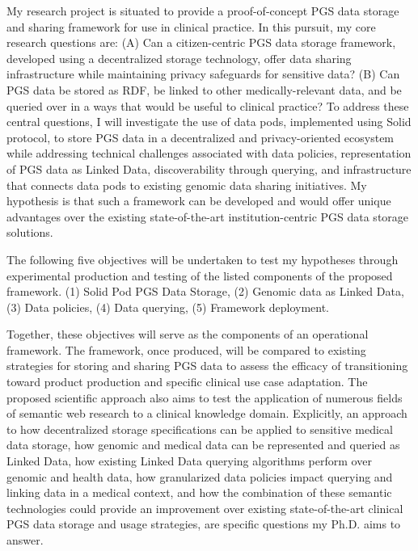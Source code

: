 \documentclass[a4paper,11pt]{article}
\begin{document}
My research project is situated to provide a proof-of-concept PGS data storage and sharing framework for use in clinical practice. 
In this pursuit, my core research questions are: 
(A) Can a citizen-centric PGS data storage framework, developed using a decentralized storage technology, offer data sharing infrastructure while maintaining privacy safeguards for sensitive data? 
(B) Can PGS data be stored as RDF, be linked to other medically-relevant data, and be queried over in a ways that would be useful to clinical practice?
To address these central questions, I will investigate the use of data pods, implemented using Solid protocol, to store PGS data in a decentralized and privacy-oriented ecosystem while addressing technical challenges associated with data policies, representation of PGS data as Linked Data, discoverability through querying, and infrastructure that connects data pods to existing genomic data sharing initiatives. 
My hypothesis is that such a framework can be developed and would offer unique advantages over the existing state-of-the-art institution-centric PGS data storage solutions. 

The following five objectives will be undertaken to test my hypotheses through experimental production and testing of the listed components of the proposed framework.
(1) Solid Pod PGS Data Storage, 
(2) Genomic data as Linked Data,
(3) Data policies,
(4) Data querying,
(5) Framework deployment.

Together, these objectives will serve as the components of an operational framework. 
The framework, once produced, will be compared to existing strategies for storing and sharing PGS data to assess the efficacy of transitioning toward product production and specific clinical use case adaptation.
The proposed scientific approach also aims to test the application of numerous fields of semantic web research to a clinical knowledge domain. 
Explicitly, an approach to how decentralized storage specifications can be applied to sensitive medical data storage, how genomic and medical data can be represented and queried as Linked Data, how existing Linked Data querying algorithms perform over genomic and health data, how granularized data policies impact querying and linking data in a medical context, and how the combination of these semantic technologies could provide an improvement over existing state-of-the-art clinical PGS data storage and usage strategies, are specific questions my Ph.D. aims to answer.
\end{document}
